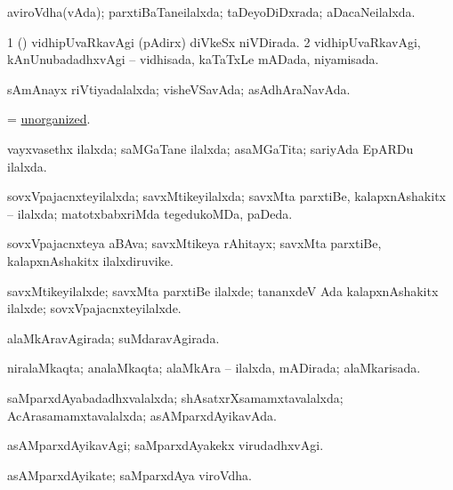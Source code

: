 \bentry
{} 
\gl{\gu}
\expl{}
\bmng
aviroVdha(vAda); parxtiBaTaneilalxda; taDeyoDiDxrada; aDacaNeilalxda. 
\emng
\eentry

\bentry
{} 
\gl{\gu}
\expl{}
\bmng
\bnum
\num{1} (\kerxY) vidhipUvaRkavAgi (pAdirx) diVkeSx niVDirada. 
\num{2} vidhipUvaRkavAgi, kAnUnubadadhxvAgi -- vidhisada, kaTaTxLe mADada, niyamisada. 
\enum
\emng
\eentry

\bentry
{} 
\gl{\gu}
\expl{}
\bmng
sAmAnayx riVtiyadalalxda; visheVSavAda; asAdhAraNavAda. 
\emng
\eentry

\bentry
{} 
\gl{\gu}
\expl{}
\bmng
= \hyperlink{unorganized}{unorganized}. 
\emng
\eentry

\bentry
{} 
\gl{\gu}
\expl{}
\bmng
vayxvasethx ilalxda; saMGaTane ilalxda; asaMGaTita; sariyAda EpARDu ilalxda. 
\emng
\eentry

\bentry
{} 
\gl{\gu}
\expl{}
\bmng
sovxVpajacnxteyilalxda; savxMtikeyilalxda; savxMta parxtiBe, kalapxnAshakitx -- ilalxda; matotxbabxriMda tegedukoMDa, paDeda. 
\emng
\eentry

\bentry
{} 
\gl{\nA}
\expl{}
\bmng
sovxVpajacnxteya aBAva; savxMtikeya rAhitayx; savxMta parxtiBe, kalapxnAshakitx ilalxdiruvike. 
\emng
\eentry

\bentry
{} 
\gl{\kirxvi}
\expl{}
\bmng
savxMtikeyilalxde; savxMta parxtiBe ilalxde; tananxdeV Ada kalapxnAshakitx ilalxde; sovxVpajacnxteyilalxde. 
\emng
\eentry

\bentry
{} 
\gl{\gu}
\expl{}
\bmng
alaMkAravAgirada; suMdaravAgirada. 
\emng
\eentry

\bentry
{} 
\gl{\gu}
\expl{}
\bmng
niralaMkaqta; analaMkaqta; alaMkAra -- ilalxda, mADirada; alaMkarisada. 
\emng
\eentry

\bentry
{} 
\gl{\gu}
\expl{}
\bmng
saMparxdAyabadadhxvalalxda; shAsatxrXsamamxtavalalxda; AcArasamamxtavalalxda; asAMparxdAyikavAda. 
\emng
\eentry

\bentry
{} 
\gl{\kirxvi}
\expl{}
\bmng
asAMparxdAyikavAgi; saMparxdAyakekx virudadhxvAgi. 
\emng
\eentry

\bentry
{} 
\gl{\nA}
\expl{}
\bmng
asAMparxdAyikate; saMparxdAya viroVdha. 
\emng
\eentry

